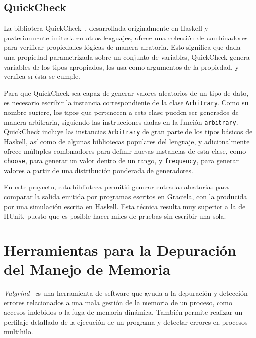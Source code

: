 \subsection{QuickCheck}

La biblioteca QuickCheck~\cite{quickcheck}, desarrollada originalmente en
Haskell y posteriormente imitada en otros lenguajes, ofrece una colección de
combinadores para verificar propiedades lógicas de manera aleatoria. Esto
significa que dada una propiedad parametrizada sobre un conjunto de variables,
QuickCheck genera variables de los tipos apropiados, los usa como argumentos de
la propiedad, y verifica si ésta se cumple. 

Para que QuickCheck sea capaz de generar valores aleatorios de un tipo de dato,
es necesario escribir la instancia correspondiente de la clase
\texttt{Arbitrary}. Como su nombre sugiere, los tipos que pertenecen a esta
clase pueden ser generados de manera arbitraria, siguiendo las instrucciones
dadas en la función \texttt{arbitrary}. QuickCheck incluye las instancias
\texttt{Arbitrary} de gran parte de los tipos básicos de Haskell, así como de
algunas bibliotecas populares del lenguaje, y adicionalmente ofrece múltiples
combinadores para definir nuevas instancias de esta clase, como \texttt{choose},
para generar un valor dentro de un rango, y \texttt{frequency}, para generar
valores a partir de una distribución ponderada de generadores.

En este proyecto, esta biblioteca permitió generar entradas aleatorias para
comparar la salida emitida por programas escritos en Graciela, con la producida
por una simulación escrita en Haskell. Esta técnica resulta muy superior a la
de HUnit, puesto que es posible hacer miles de pruebas sin escribir una sola.

\section{Herramientas para la Depuración del Manejo de Memoria}

\textit{Valgrind}~\cite{valgrind} es una herramienta de software que ayuda a la
depuración y detección errores relacionados a una mala gestión de la memoria de
un proceso, como accesos indebidos o la fuga de memoria dinámica. También
permite realizar un perfilaje detallado de la ejecución de un programa y
detectar errores en procesos multihilo.

